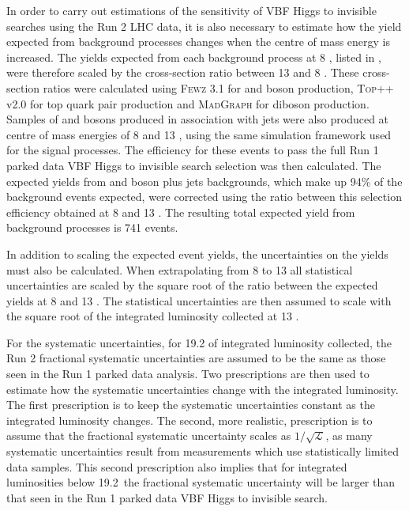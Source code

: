 In order to carry out estimations of the sensitivity of \ac{VBF} Higgs to invisible searches using the Run 2 LHC data, it is also necessary to estimate how the yield expected from background processes changes when the centre of mass energy is increased. The yields expected from each background process at 8 \TeV, listed in , were therefore scaled by the cross-section ratio between 13 and 8 \TeV. These cross-section ratios were calculated using \textsc{Fewz} 3.1 for \PW and \PZ boson production, \textsc{Top++} v2.0 for top quark pair production and \textsc{MadGraph} for diboson production. Samples of \PW and \PZ bosons produced in association with jets were also produced at centre of mass energies of 8 and 13 \TeV, using the same simulation framework used for the signal processes. The efficiency for these events to pass the full Run 1 parked data \ac{VBF} Higgs to invisible search selection was then calculated. The expected yields from \PW and \PZ boson plus jets backgrounds, which make up 94\% of the background events expected, were corrected using the ratio between this selection efficiency obtained at 8 and 13 \TeV. The resulting total expected yield from background processes is 741 events.

In addition to scaling the expected event yields, the uncertainties on the yields must also be calculated. When extrapolating from 8 to 13 \TeV all statistical uncertainties are scaled by the square root of the ratio between the expected yields at 8 \TeV and 13 \TeV. The statistical uncertainties are then assumed to scale with the square root of the integrated luminosity collected at 13 \TeV.

For the systematic uncertainties, for 19.2 \invfb of integrated luminosity collected, the Run 2 fractional systematic uncertainties are assumed to be the same as those seen in the Run 1 parked data analysis. Two prescriptions are then used to estimate how the systematic uncertainties change with the integrated luminosity. The first prescription is to keep the systematic uncertainties constant as the integrated luminosity changes. The second, more realistic, prescription is to assume that the fractional systematic uncertainty scales as $1/\sqrt{\mathcal{L}}$, as many systematic uncertainties result from measurements which use statistically limited data samples. This second prescription also implies that for integrated luminosities below 19.2 \invfb\,the fractional systematic uncertainty will be larger than that seen in the Run 1 parked data \ac{VBF} Higgs to invisible search.



